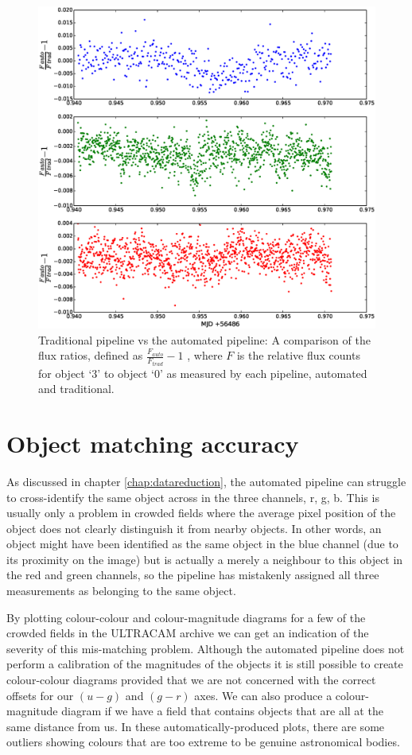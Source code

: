 \begin{figure}
\centering
\includegraphics[width=140mm]{images/ratio-of-ratios.eps}
\caption{Traditional pipeline vs the automated pipeline: A comparison of the flux ratios, defined as $\frac{F_{auto}}{F_{trad}} - 1$ , where $F$ is the relative flux counts for object `3' to object `0' as measured by each pipeline, automated and traditional.}
\label{fig:ratio-of-ratios}
\end{figure}


\section{Object matching accuracy}
As discussed in chapter \ref{chap:datareduction}, the automated pipeline can struggle to cross-identify the same object across in the three channels, r, g, b. This is usually only a problem in crowded fields where the average pixel position of the object does not clearly distinguish it from nearby objects. In other words, an object might have been identified as the same object in the blue channel (due to its proximity on the image) but is actually a merely a neighbour to this object in the red and green channels, so the pipeline has mistakenly assigned all three measurements as belonging to the same object.

By plotting colour-colour and colour-magnitude diagrams for a few of the crowded fields in the ULTRACAM archive we can get an indication of the severity of this mis-matching problem. Although the automated pipeline does not perform a calibration of the magnitudes of the objects it is still possible to create colour-colour diagrams provided that we are not concerned with the correct offsets for our $(u-g)$ and $(g-r)$ axes. We can also produce a colour-magnitude diagram if we have a field that contains objects that are all at the same distance from us. In these automatically-produced plots, there are some outliers showing colours that are too extreme to be genuine astronomical bodies. 

